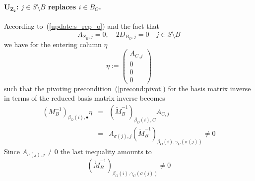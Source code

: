\documentclass[a4paper]{article}
\begin{document}
\paragraph{$\mathbf{U_{Z_{2}}}$: $j \in S \setminus B$ replaces $i \in B_{O}$.}
According to~(\ref{update:s_rep_o}) and the fact that
\begin{equation}
A_{S_{B},j}=0, \quad 2D_{B_{O}, j}=0 \quad j \in S \setminus B
\end{equation}
we have for the entering column $\eta$
\begin{equation}
\eta:=
\left(
\begin{array}{c}
A_{C, j} \\
\hline
0 \\
\hline
0 \\
\hline
0
\end{array}
\right)
\end{equation}
such that the pivoting precondition~(\ref{precond:pivot})
for the basis matrix inverse in terms of
the reduced basis matrix inverse becomes
\begin{eqnarray}
\left(M_{B}^{-1}\right)_{\beta_{O}(i), \bullet} \eta
&=&
\left(\check{M}_{B}^{-1}\right)_{\beta_{O}(i),C}A_{C,j}
\nonumber \\
&=&
A_{\sigma(j),j}
 \left(\check{M}_{B}^{-1}\right)_{\beta_{O}(i), \gamma_{C}(\sigma(j))} \neq 0
\nonumber
\end{eqnarray}
Since $A_{\sigma(j),j} \neq 0$ the last inequality amounts to
\begin{equation}
\left(\check{M}_{B}^{-1}\right)_{\beta_{O}(i), \gamma_{C}(\sigma(j))} \neq 0
\end{equation}
\end{document}
